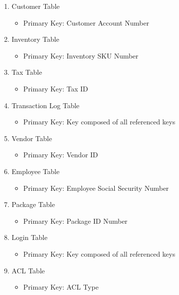 \documentclass{report}
\begin{document}
    \begin{enumerate}
        \item{Customer Table}
        \begin{itemize}
            \item{Primary Key: Customer Account Number}
        \end{itemize}
        \item{Inventory Table}
        \begin{itemize}
            \item{Primary Key: Inventory SKU Number}
        \end{itemize}
        \item{Tax Table}
        \begin{itemize}
            \item{Primary Key: Tax ID}
        \end{itemize}
        \item{Transaction Log Table}
        \begin{itemize}
            \item{Primary Key: Key composed of all referenced keys}
        \end{itemize}
        \item{Vendor Table}
        \begin{itemize}
            \item{Primary Key: Vendor ID}
        \end{itemize}
        \item{Employee Table}
        \begin{itemize}
            \item{Primary Key: Employee Social Security Number}
        \end{itemize}
        \item{Package Table}
        \begin{itemize}
            \item{Primary Key: Package ID Number}
        \end{itemize}
        \item{Login Table}
        \begin{itemize}
            \item{Primary Key: Key composed of all referenced keys}
        \end{itemize}
        \item{ACL Table}
        \begin{itemize}
            \item{Primary Key: ACL Type}
        \end{itemize}

\end{enumerate}
\end{document}
